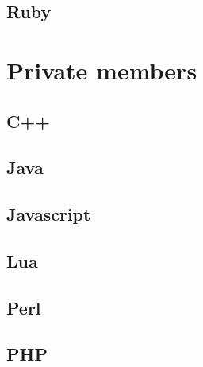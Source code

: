 \documentclass{KodeBook}
\begin{document}
\subsection{Ruby}

%


\section{Private members}

\subsection{C++}

%

\subsection{Java}

%

\subsection{Javascript} 

%
%
%


\subsection{Lua}


\subsection{Perl}

%

\subsection{PHP}
\end{document}
